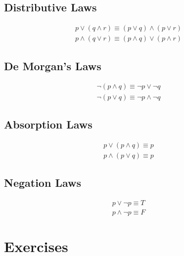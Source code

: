 \documentclass[12pt letter]{report}
\begin{document}
\subsection{Distributive Laws}

\begin{align*}
	p \vee \left( q \wedge r \right) \equiv \left( p \vee q \right)  \wedge \left( p \vee r \right) \\
	p \wedge \left( q \vee r  \right)  \equiv \left( p \wedge q  \right) \vee \left( p \wedge r \right)
\end{align*}

\subsection{De Morgan's Laws}

\begin{align*}
	\neg \left( p \wedge q \right) \equiv \neg p \vee \neg  q \\
	\neg \left( p \vee q  \right) \equiv \neg p \wedge \neg q
\end{align*}

\subsection{Absorption Laws}

\begin{align*}
	p \vee \left( p \wedge q  \right)  \equiv p \\
	p \wedge \left( p \vee q  \right) \equiv p
\end{align*}

\subsection{Negation Laws}

\begin{align*}
	p \vee \neg p \equiv T \\
	p \wedge \neg p \equiv F
\end{align*}

\section{Exercises}
\end{document}
